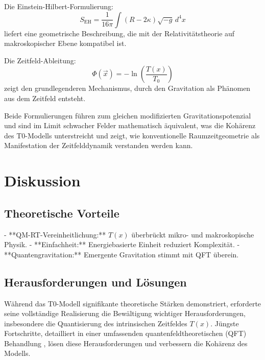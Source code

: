 \documentclass[12pt,a4paper]{article}
\newcommand{\Tfield}{T(x)}
\newcommand{\Tzero}{T_0}
\newcommand{\vecx}{\vec{x}}
\begin{document}
	Die Einstein-Hilbert-Formulierung:
	\begin{equation}
		S_{\text{EH}} = \frac{1}{16\pi} \int (R - 2\kappa) \sqrt{-g} \, d^4x
	\end{equation}
	liefert eine geometrische Beschreibung, die mit der Relativitätstheorie auf makroskopischer Ebene kompatibel ist.
	
	Die Zeitfeld-Ableitung:
	\begin{equation}
		\Phi(\vecx) = -\ln\left(\frac{\Tfield}{\Tzero}\right)
	\end{equation}
	zeigt den grundlegenderen Mechanismus, durch den Gravitation als Phänomen aus dem Zeitfeld entsteht.
	
	Beide Formulierungen führen zum gleichen modifizierten Gravitationspotenzial und sind im Limit schwacher Felder mathematisch äquivalent, was die Kohärenz des T0-Modells unterstreicht und zeigt, wie konventionelle Raumzeitgeometrie als Manifestation der Zeitfelddynamik verstanden werden kann.
	\section{Diskussion}
	\label{sec:discussion}
	
	\subsection{Theoretische Vorteile}
	- **QM-RT-Vereinheitlichung:** \(\Tfield\) überbrückt mikro- und makroskopische Physik.
	- **Einfachheit:** Energiebasierte Einheit reduziert Komplexität.
	- **Quantengravitation:** Emergente Gravitation stimmt mit QFT überein.
	
	\subsection{Herausforderungen und Lösungen}
	\label{subsec:challenges}
	
	Während das T0-Modell signifikante theoretische Stärken demonstriert, erforderte seine vollständige Realisierung die Bewältigung wichtiger Herausforderungen, insbesondere die Quantisierung des intrinsischen Zeitfeldes \(\Tfield\). Jüngste Fortschritte, detailliert in einer umfassenden quantenfeldtheoretischen (QFT) Behandlung \cite{pascher_qft_2025}, lösen diese Herausforderungen und verbessern die Kohärenz des Modells.
	
\end{document}
